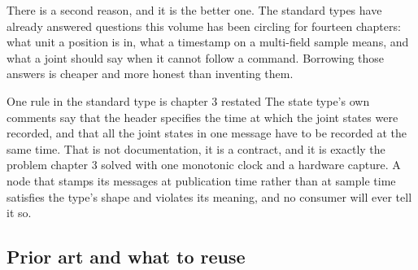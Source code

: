 There is a second reason, and it is the better one. The standard types have
already answered questions this volume has been circling for fourteen chapters:
what unit a position is in, what a timestamp on a multi-field sample means, and
what a joint should say when it cannot follow a command. Borrowing those answers
is cheaper and more honest than inventing them.

\begin{note}{One rule in the standard type is chapter 3 restated}
The state type's own comments say that the header specifies the time at which the
joint states were recorded, and that all the joint states in one message have to
be recorded at the same time. That is not documentation, it is a contract, and it
is exactly the problem chapter 3 solved with one monotonic clock and a hardware
capture. A node that stamps its messages at publication time rather than at
sample time satisfies the type's shape and violates its meaning, and no consumer
will ever tell it so.
\end{note}

\subsection*{Prior art and what to reuse}

